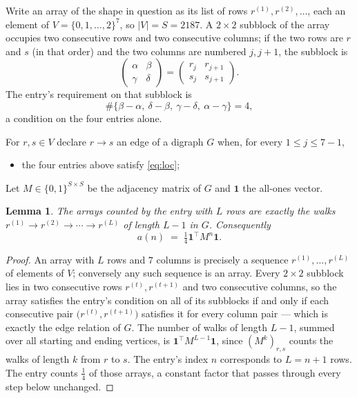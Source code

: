 \documentclass[11pt,a4paper]{article}
\theoremstyle{plain}
\newtheorem{lemma}[theorem]{Lemma}
\theoremstyle{definition}
\begin{document}
Write an array of the shape in question as its list of rows
$r^{(1)},r^{(2)},\dots$, each an element of
$V=\{0,1,\dots,2\}^{7}$, so $|V|=S=2187$. A $2\times2$ subblock of the array
occupies two consecutive rows and two consecutive columns; if the two rows are $r$
and $s$ (in that order) and the two columns are numbered $j,j+1$,
the subblock is
\[
\begin{pmatrix}\alpha&\beta\\\gamma&\delta\end{pmatrix}=\begin{pmatrix}r_j&r_{j+1}\\s_j&s_{j+1}\end{pmatrix}.
\]
The entry's requirement on that subblock is
\begin{equation}\label{eq:loc}
\#\{\beta-\alpha,\ \delta-\beta,\ \gamma-\delta,\ \alpha-\gamma\}=4,
\end{equation}
a condition on the four entries alone.

For $r,s\in V$ declare $r\to s$ an edge of a digraph $G$ when, for every
$1\le j\le 7-1$,
\begin{itemize}
\item the four entries above satisfy \eqref{eq:loc};

\end{itemize}
Let $M\in\{0,1\}^{S\times S}$ be the adjacency matrix of $G$ and $\mathbf{1}$ the
all-ones vector.

\begin{lemma}\label{lem:walk}
The arrays counted by the entry with $L$ rows are exactly the walks
$r^{(1)}\to r^{(2)}\to\cdots\to r^{(L)}$ of length $L-1$ in $G$. Consequently
\[
a(n)\;=\;\tfrac1{4}\mathbf{1}^{\!\top}M^{n}\mathbf{1} .
\]
\end{lemma}

\begin{proof}
An array with $L$ rows and $7$ columns is precisely a sequence
$r^{(1)},\dots,r^{(L)}$ of elements of $V$; conversely any such sequence is an array.
Every $2\times2$ subblock lies in two consecutive rows $r^{(t)},r^{(t+1)}$ and two
consecutive columns, so the array satisfies the entry's condition on all of its subblocks
if and only if each consecutive pair $\bigl(r^{(t)},r^{(t+1)}\bigr)$ satisfies it for
every column pair --- which is exactly the edge relation of $G$. The number of walks of
length $L-1$, summed over all starting and ending vertices, is
$\mathbf{1}^{\!\top}M^{L-1}\mathbf{1}$, since $(M^{k})_{r,s}$ counts the walks of
length $k$ from $r$ to $s$. The entry's index $n$ corresponds to $L=n+1$ rows. The entry counts $\tfrac1{4}$ of those arrays, a constant factor that passes through every step below unchanged.
\end{proof}
\end{document}
